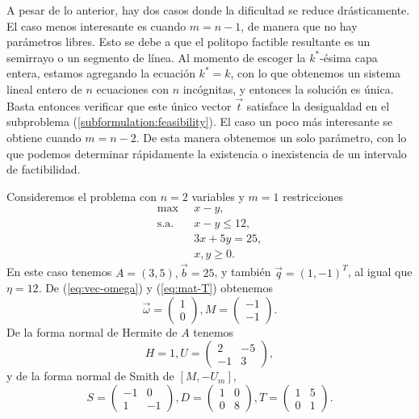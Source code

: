 A pesar de lo anterior, hay dos casos donde la dificultad se reduce drásticamente. El caso menos
interesante es cuando $m = n - 1$, de manera que no hay parámetros libres. Esto se debe a que el
politopo factible resultante es un semirrayo o un segmento de línea. Al momento de escoger la
$k^*$-ésima capa entera, estamos agregando la ecuación $k^* = k$, con lo que obtenemos un sistema
lineal entero de $n$ ecuaciones con $n$ incógnitas, y entonces la solución es única. Basta entonces
verificar que este único vector $\vec{t}$ satisface la desigualdad en el subproblema
(\ref{subformulation:feasibility}). El caso un poco más interesante se obtiene cuando $m = n - 2$.
De esta manera obtenemos un solo parámetro, con lo que podemos determinar rápidamente la existencia
o inexistencia de un intervalo de factibilidad.

\begin{example}
	\label{ex:two-var}
	Consideremos el problema con $n = 2$ variables y $m = 1$ restricciones
	\begin{align*}
		\max
			~& x - y, \\
		\text{s.a.} \quad
			& x - y \leq 12, \\
			& 3x + 5y = 25, \\
			& x, y \geq 0.
	\end{align*}
	En este caso tenemos $A = (3, 5), \vec{b} = 25$, y también $\vec{q} = (1, -1)^T$, al igual que
	$\eta = 12$. De (\ref{eq:vec-omega}) y (\ref{eq:mat-T}) obtenemos
	\begin{equation*}
		\vec{\omega} = \begin{pmatrix} 1 \\ 0 \end{pmatrix},
		M = \begin{pmatrix} -1 \\ -1 \end{pmatrix}.
	\end{equation*}
	De la forma normal de Hermite de $A$ tenemos
	\begin{equation*}
		H = 1, U = \begin{pmatrix} 2 & -5 \\ -1 & 3 \end{pmatrix},
	\end{equation*}
	y de la forma normal de Smith de $[M, -U_m]$,
	\begin{equation*}
		S = \begin{pmatrix} -1 & 0 \\ 1 & -1 \end{pmatrix},
		D = \begin{pmatrix} 1 & 0 \\ 0 & 8 \end{pmatrix},
		T = \begin{pmatrix} 1 & 5 \\ 0 & 1 \end{pmatrix}. 
	\end{equation*}


\end{example}
